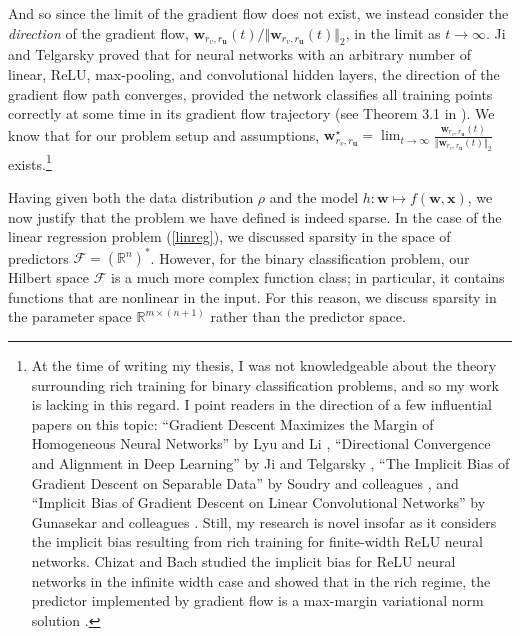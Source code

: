 \documentclass{article}
\begin{document}
And so since the limit of the gradient flow does not exist, we instead consider the \textit{direction} of the gradient flow, $\boldsymbol{w}_{r_v, r_{\boldsymbol{u}}}(t)/\Vert \boldsymbol{w}_{r_v, r_{\boldsymbol{u}}}(t) \Vert_2$, in the limit as $t \rightarrow \infty$. Ji and Telgarsky proved that for neural networks with an arbitrary number of linear, ReLU, max-pooling, and convolutional hidden layers, the direction of the gradient flow path converges, provided the network classifies all training points correctly at some time in its gradient flow trajectory (see Theorem 3.1 in \cite{ji2020directional}). We know that for our problem setup and assumptions, $\boldsymbol{w}_{r_v, r_{\boldsymbol{u}}}^{\star} = \lim_{t \to \infty} \frac{\boldsymbol{w}_{r_v, r_{\boldsymbol{u}}}(t)}{\Vert \boldsymbol{w}_{r_v, r_{\boldsymbol{u}}}(t) \Vert_2}$ exists.\footnote{At the time of writing my thesis, I was not knowledgeable about the theory surrounding rich training for binary classification problems, and so my work is lacking in this regard. I point readers in the direction of a few influential papers on this topic: \enquote{Gradient Descent Maximizes the Margin of Homogeneous Neural Networks} by Lyu and Li \cite{lyu2019gradient}, \enquote{Directional Convergence and Alignment in Deep Learning} by Ji and Telgarsky \cite{ji2020directional}, \enquote{The Implicit Bias of Gradient Descent on Separable Data} by Soudry and colleagues \cite{soudry2018implicit}, and \enquote{Implicit Bias of Gradient Descent on Linear Convolutional Networks} by Gunasekar and colleagues \cite{gunasekar2018implicitconv}. Still, my research is novel insofar as it considers the implicit bias resulting from rich training for finite-width ReLU neural networks. Chizat and Bach studied the implicit bias for ReLU neural networks in the infinite width case and showed that in the rich regime, the predictor implemented by gradient flow is a max-margin variational norm solution \cite{chizat2020implicit}.}

Having given both the data distribution $\rho$ and the model $h: \boldsymbol{w} \mapsto f(\boldsymbol{w}, \boldsymbol{x})$, we now justify that the problem we have defined is indeed sparse. In the case of the linear regression problem (\ref{linreg}), we discussed sparsity in the space of predictors $\mathcal{F} = (\mathbb{R}^n)^*$. However, for the binary classification problem, our Hilbert space $\mathcal{F}$ is a much more complex function class; in particular, it contains functions that are nonlinear in the input. For this reason, we discuss sparsity in the parameter space $\mathbb{R}^{m\times(n+1)}$ rather than the predictor space.
\end{document}
